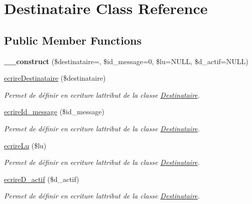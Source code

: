 \hypertarget{class_destinataire}{}\section{Destinataire Class Reference}
\label{class_destinataire}
\subsection*{Public Member Functions}
\begin{DoxyCompactItemize}
\item 
\mbox{\label{class_destinataire_a4d0b546ebe264b92b0f363e9f5ac42cd}} 
{\bfseries \+\_\+\+\_\+construct} (\$destinataire=\textquotesingle{}\textquotesingle{}, \$id\+\_\+message=0, \$lu=N\+U\+LL, \$d\+\_\+actif=N\+U\+LL)
\item 
\hyperlink{class_destinataire_a8db62fe26d37f538b991e2f28283245b}{ecrire\+Destinataire} (\$destinataire)
\begin{DoxyCompactList}\small\item\em Permet de définir en ecriture l\textquotesingle{}attribut de la classe \hyperlink{class_destinataire}{Destinataire}. \end{DoxyCompactList}\item 
\hyperlink{class_destinataire_a82b89e128381c85b4da25060e3a01630}{ecrire\+Id\+\_\+message} (\$id\+\_\+message)
\begin{DoxyCompactList}\small\item\em Permet de définir en ecriture l\textquotesingle{}attribut de la classe \hyperlink{class_destinataire}{Destinataire}. \end{DoxyCompactList}\item 
\hyperlink{class_destinataire_a72600f7fb8cbd8a993d4b4729784cd7c}{ecrire\+Lu} (\$lu)
\begin{DoxyCompactList}\small\item\em Permet de définir en ecriture l\textquotesingle{}attribut de la classe \hyperlink{class_destinataire}{Destinataire}. \end{DoxyCompactList}\item 
\hyperlink{class_destinataire_a41d03af12ef66b01520db7cf86c08f6a}{ecrire\+D\+\_\+actif} (\$d\+\_\+actif)
\begin{DoxyCompactList}\small\item\em Permet de définir en ecriture l\textquotesingle{}attribut de la classe \hyperlink{class_destinataire}{Destinataire}. \end{DoxyCompactList}\item 

\end{DoxyCompactItemize}
